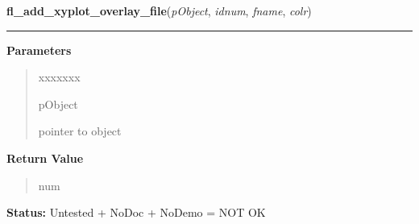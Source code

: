 \hspace{.8\funcindent}\begin{boxedminipage}{\funcwidth}

    \raggedright \textbf{fl\_add\_xyplot\_overlay\_file}(\textit{pObject}, \textit{idnum}, \textit{fname}, \textit{colr})

    \vspace{-1.5ex}

    \rule{\textwidth}{0.5\fboxrule}
\setlength{\parskip}{2ex}
\setlength{\parskip}{1ex}
      \textbf{Parameters}
      \vspace{-1ex}

      \begin{quote}
        \begin{Ventry}{xxxxxxx}

          \item[pObject]

          pointer to object

        \end{Ventry}

      \end{quote}

      \textbf{Return Value}
    \vspace{-1ex}

      \begin{quote}
      num

      \end{quote}

\textbf{Status:} Untested + NoDoc + NoDemo = NOT OK



    \end{boxedminipage}

    \label{xformslib:library:fl_set_xyplot_return}

    \vspace{0.5ex}

